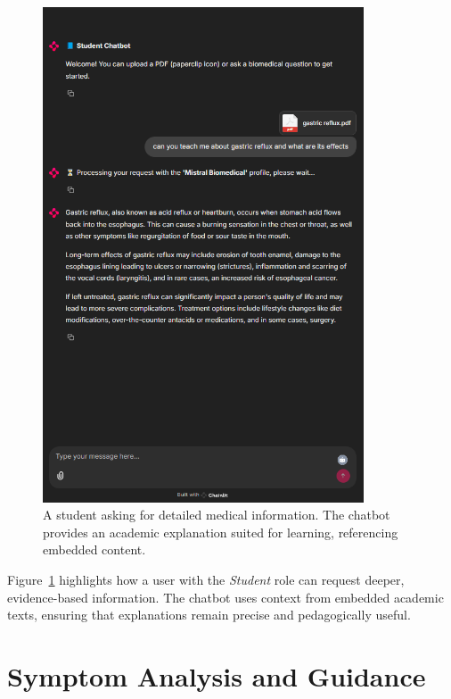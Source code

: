 \begin{figure}[htbp]
    \centering
    \includegraphics[width=0.85\textwidth]{Images/pdfquestion.png}
    \caption{A student asking for detailed medical information. The chatbot provides an academic explanation suited for learning, referencing embedded content.}
    \label{fig:student-chatbot}
\end{figure}

Figure~\ref{fig:student-chatbot} highlights how a user with the \emph{Student} role can request deeper, evidence-based information. The chatbot uses context from embedded academic texts, ensuring that explanations remain precise and pedagogically useful.

\section{Symptom Analysis and Guidance}
\label{sec:patient-symptoms}


